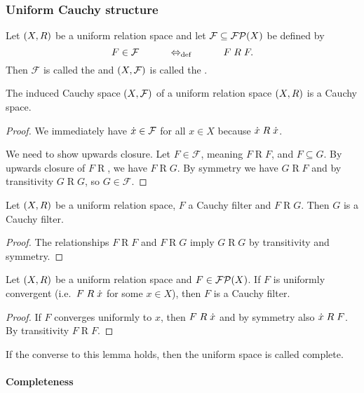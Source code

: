 \subsubsection{Uniform Cauchy structure}
\begin{definition}
Let $\left( X,R \right)$ be a uniform relation space and let $\mathcal{F}\subseteq \operatorname{\mathcal{FP}}(X)$ be defined by
\[ F\in \mathcal{F} \qquad\quad\Leftrightarrow_{\text{def}}\quad\qquad F\mathrel{R} F. \]
Then $\mathcal{F}$ is called the  and $\left( X,\mathcal{F} \right)$ is called the .
\end{definition}
\begin{lemma}
The induced Cauchy space $\left( X, \mathcal{F} \right)$ of a uniform relation space $\left( X,R \right)$ is a Cauchy space.
\end{lemma}
\begin{proof}
We immediately have $\dot{x}\in\mathcal{F}$ for all $x\in X$ because $\dot{x}\mathrel{R} \dot{x}$.

We need to show upwards closure. Let $F\in \mathcal{F}$, meaning $F\mathrel{R} F$, and $F\subseteq G$. By upwards closure of $F\mathrel{R}$, we have $F\mathrel{R} G$. By symmetry we have $G\mathrel{R} F$ and by transitivity $G\mathrel{R} G$, so $G\in\mathcal{F}$.
\end{proof}

\begin{lemma}
Let $\left( X, R \right)$ be a uniform relation space, $F$ a Cauchy filter and $F\mathrel{R} G$. Then $G$ is a Cauchy filter.
\end{lemma}
\begin{proof}
The relationships $F\mathrel{R} F$ and $F\mathrel{R} G$ imply $G\mathrel{R} G$ by transitivity and symmetry.
\end{proof}


\begin{lemma} \label{uniformlyConvergentImpliesCauchy}
Let $\left( X,R \right)$ be a uniform relation space and $F\in\operatorname{\mathcal{FP}}(X)$. If $F$ is uniformly convergent (i.e.\ $F\mathrel{R}\dot{x}$ for some $x\in X$), then $F$ is a Cauchy filter.
\end{lemma}
\begin{proof}
If $F$ converges uniformly to $x$, then $F\mathrel{R}\dot{x}$ and by symmetry also $\dot{x}\mathrel{R}F$. By transitivity $F\mathrel{R}F$. 
\end{proof}
If the converse to this lemma holds, then the uniform space is called complete.

\paragraph{Completeness}

